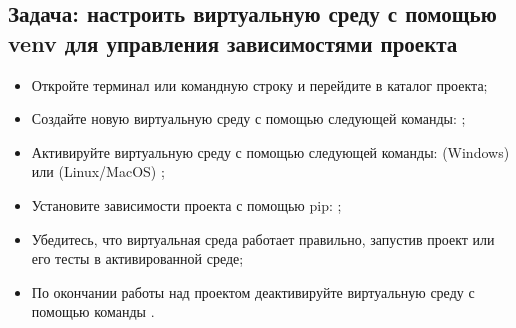 \documentclass[letterpaper,10pt,russian]{sphinxmanual}
\begin{document}
\subsection{Задача: настроить виртуальную среду с помощью venv для управления зависимостями проекта}
\label{\detokenize{educational_materials/path_venv/exercises:venv}}\begin{itemize}
\item {} 
\sphinxAtStartPar
Откройте терминал или командную строку и перейдите в каталог проекта;

\item {} 
\sphinxAtStartPar
Создайте новую виртуальную среду с помощью следующей команды: ;

\item {} 
\sphinxAtStartPar
Активируйте виртуальную среду с помощью следующей команды: (Windows)  или (Linux/MacOS) ;

\item {} 
\sphinxAtStartPar
Установите зависимости проекта с помощью pip: ;

\item {} 
\sphinxAtStartPar
Убедитесь, что виртуальная среда работает правильно, запустив проект или его тесты в активированной среде;

\item {} 
\sphinxAtStartPar
По окончании работы над проектом деактивируйте виртуальную среду с помощью команды .

\end{itemize}
\end{document}
